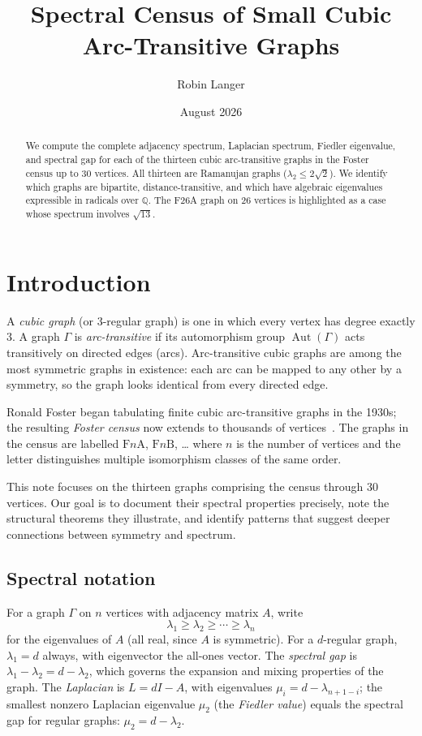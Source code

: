 \documentclass[11pt,a4paper]{article}
\title{\textbf{Spectral Census of Small Cubic Arc-Transitive Graphs}}
\author{Robin Langer}
\date{August 2026}
\DeclareMathOperator{\Aut}{Aut}
\begin{document}
\maketitle

\begin{abstract}
We compute the complete adjacency spectrum, Laplacian spectrum, Fiedler eigenvalue, and spectral gap for each of the thirteen cubic arc-transitive graphs in the Foster census up to 30 vertices. All thirteen are Ramanujan graphs ($\lambda_2 \leq 2\sqrt{2}$). We identify which graphs are bipartite, distance-transitive, and which have algebraic eigenvalues expressible in radicals over $\mathbb{Q}$. The F26A graph on 26 vertices is highlighted as a case whose spectrum involves $\sqrt{13}$.
\end{abstract}

\section{Introduction}

A \emph{cubic graph} (or 3-regular graph) is one in which every vertex has degree exactly 3. A graph $\Gamma$ is \emph{arc-transitive} if its automorphism group $\Aut(\Gamma)$ acts transitively on directed edges (arcs). Arc-transitive cubic graphs are among the most symmetric graphs in existence: each arc can be mapped to any other by a symmetry, so the graph looks identical from every directed edge.

Ronald Foster began tabulating finite cubic arc-transitive graphs in the 1930s; the resulting \emph{Foster census} now extends to thousands of vertices~\cite{foster1988,conder2002}. The graphs in the census are labelled $\mathrm{F}n\mathrm{A}$, $\mathrm{F}n\mathrm{B}$, \ldots{} where $n$ is the number of vertices and the letter distinguishes multiple isomorphism classes of the same order.

This note focuses on the thirteen graphs comprising the census through 30 vertices. Our goal is to document their spectral properties precisely, note the structural theorems they illustrate, and identify patterns that suggest deeper connections between symmetry and spectrum.

\subsection{Spectral notation}

For a graph $\Gamma$ on $n$ vertices with adjacency matrix $A$, write
\[
\lambda_1 \geq \lambda_2 \geq \cdots \geq \lambda_n
\]
for the eigenvalues of $A$ (all real, since $A$ is symmetric). For a $d$-regular graph, $\lambda_1 = d$ always, with eigenvector the all-ones vector. The \emph{spectral gap} is $\lambda_1 - \lambda_2 = d - \lambda_2$, which governs the expansion and mixing properties of the graph. The \emph{Laplacian} is $L = dI - A$, with eigenvalues $\mu_i = d - \lambda_{n+1-i}$; the smallest nonzero Laplacian eigenvalue $\mu_2$ (the \emph{Fiedler value}) equals the spectral gap for regular graphs: $\mu_2 = d - \lambda_2$.
\end{document}
